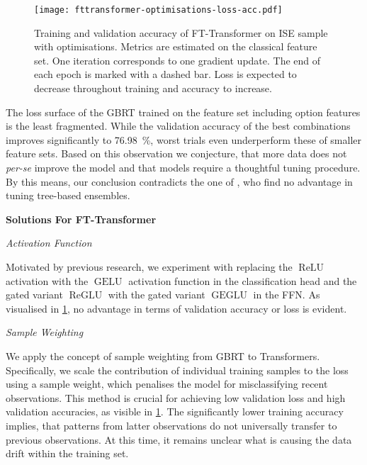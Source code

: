 \begin{figure}[!ht]
    \centering
    \texttt{[image: fttransformer-optimisations-loss-acc.pdf]}
    \caption[Training and Validation Accuracy of FT-Transformer on  with Optimisations]{Training and validation accuracy of FT-Transformer on \gls{ISE} sample with optimisations. Metrics are estimated on the classical feature set. One iteration corresponds to one gradient update. The end of each epoch is marked with a dashed bar. Loss is expected to decrease throughout training and accuracy to increase.}
    \label{fig:fttransformer-optimisations-loss-acc}
\end{figure}


The loss surface of the \gls{GBRT} trained on the feature set including option features is the least fragmented. While the validation accuracy of the best combinations improves significantly to \SI{76.98}{\percent}, worst trials even underperform these of smaller feature sets. Based on this observation we conjecture, that more data does not \emph{per-se} improve the model and that models require a thoughtful tuning procedure. By this means, our conclusion contradicts the one of \textcite[][14]{ronenMachineLearningTrade2022}, who find no advantage in tuning tree-based ensembles.

\textbf{Solutions For FT-Transformer}

\emph{Activation Function}

Motivated by previous research, we experiment with replacing the $\operatorname{ReLU}$ activation with the $\operatorname{GELU}$ activation function \autocite[][2]{hendrycksGaussianErrorLinear2020} in the classification head and the gated variant $\operatorname{ReGLU}$ with the gated variant $\operatorname{GEGLU}$ \autocite[][2]{shazeerGLUVariantsImprove2020} in the \gls{FFN}. As visualised in \cref{fig:fttransformer-optimisations-loss-acc}, no advantage in terms of validation accuracy or loss is evident.

\emph{Sample Weighting}

We apply the concept of sample weighting from \gls{GBRT} to Transformers. Specifically, we scale the contribution of individual training samples to the loss using a sample weight, which penalises the model for misclassifying recent observations. This method is crucial for achieving low validation loss and high validation accuracies, as visible in \cref{fig:fttransformer-optimisations-loss-acc}. The significantly lower training accuracy implies, that patterns from latter observations do not universally transfer to previous observations. At this time, it remains unclear what is causing the data drift within the training set.

